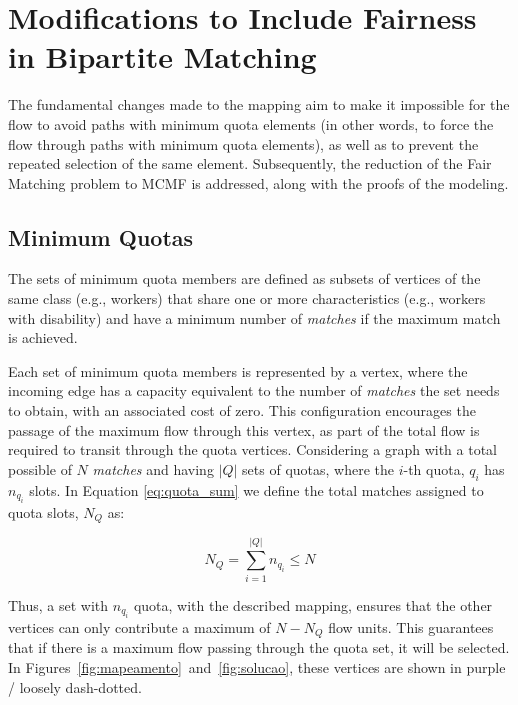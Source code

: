         
        \section{Modifications to Include Fairness in Bipartite Matching}
        
            The fundamental changes made to the mapping aim to make it impossible for the flow to avoid paths with minimum quota elements (in other words, to force the flow through paths with minimum quota elements), as well as to prevent the repeated selection of the same element.
            Subsequently, the reduction of the Fair Matching problem to MCMF is addressed, along with the proofs of the modeling.
            
            \subsection{Minimum Quotas}
            
                The sets of minimum quota members are defined as subsets of vertices of the same class (e.g., workers) that share one or more characteristics (e.g., workers with disability) and have a minimum number of \textit{matches} if the maximum match is achieved.
                
                Each set of minimum quota members is represented by a vertex, where the incoming edge has a capacity equivalent to the number of \textit{matches} the set needs to obtain, with an associated cost of zero. This configuration encourages the passage of the maximum flow through this vertex, as part of the total flow is required to transit through the quota vertices.
                Considering a graph with a total possible of $N$ \textit{matches} and having $|Q|$ sets of quotas, where the \( i \)-th quota, $q_i$ has $n_{q_i}$ slots.
                In Equation \ref{eq:quota_sum} we define the total matches assigned to quota slots, $N_Q$ as:

                \begin{equation}
                    N_Q = \sum_{i=1}^{|Q|} n_{q_i} \leq N
                    \label{eq:quota_sum}
                \end{equation}
                
                Thus, a set with $n_{q_i}$ quota, with the described mapping, ensures that the other vertices can only contribute a maximum of $N - N_Q$ flow units. This guarantees that if there is a maximum flow passing through the quota set, it will be selected.
                In Figures~\ref{fig:mapeamento}~and~\ref{fig:solucao}, these vertices are shown in purple / loosely dash-dotted.
                
